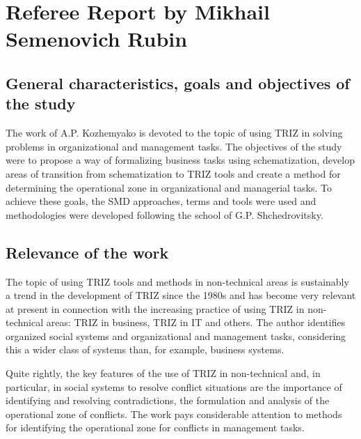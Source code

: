 \section{Referee Report by Mikhail Semenovich Rubin}

\subsection*{General characteristics, goals and objectives of the study}
The work of A.P. Kozhemyako is devoted to the topic of using TRIZ in solving
problems in organizational and management tasks. The objectives of the study
were to propose a way of formalizing business tasks using schematization,
develop areas of transition from schematization to TRIZ tools and create a
method for determining the operational zone in organizational and managerial
tasks.  To achieve these goals, the SMD approaches, terms and tools were used
and methodologies were developed following the school of G.P. Shchedrovitsky.

\subsection*{Relevance of the work}
The topic of using TRIZ tools and methods in non-technical areas is
sustainably a trend in the development of TRIZ since the 1980s and has become
very relevant at present in connection with the increasing practice of using
TRIZ in non-technical areas: TRIZ in business, TRIZ in IT and others.  The
author identifies organized social systems and organizational and management
tasks, considering this a wider class of systems than, for example, business
systems.

Quite rightly, the key features of the use of TRIZ in non-technical and, in
particular, in social systems to resolve conflict situations are the
importance of identifying and resolving contradictions, the formulation and
analysis of the operational zone of conflicts. The work pays considerable
attention to methods for identifying the operational zone for conflicts in
management tasks.

